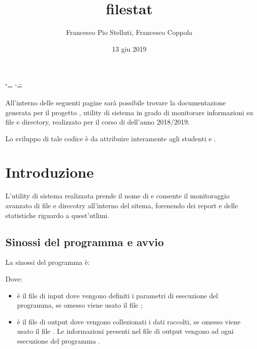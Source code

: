 \documentclass[letterpaper,10pt,italian,openany,oneside]{sphinxmanual}
\title{filestat}
\date{13 giu 2019}
\author{Francesco Pio Stelluti, Francesco Coppola}
\begin{document}
\ifdefined\shorthandoff
  \ifnum\catcode`\=\string=\active\shorthandoff{=}\fi
  \ifnum\catcode`\"=\active{}\fi
\fi

\pagestyle{empty}
\sphinxmaketitle
\pagestyle{plain}
\sphinxtableofcontents
\pagestyle{normal}
\label{\detokenize{index::doc}}


All’interno delle seguenti pagine sarà possibile trovare la documentazione
generata per il progetto , utility di sistema in grado di monitorare informazioni
su file e directory, realizzato per il corso di 
dell’anno 2018/2019.

Lo sviluppo di tale codice è da attribuire interamente agli studenti  e .


\chapter{Introduzione}
\label{\detokenize{introduzione:introduzione}}\label{\detokenize{introduzione::doc}}\begin{quote}

\end{quote}

L’utility di sistema realizzata prende il nome di  e consente il monitoraggio avanzato di
file e direcotry all’interno del sitema, forenendo dei report e delle statistiche riguardo a quest’utlimi.


\section{Sinossi del programma e avvio}
\label{\detokenize{introduzione:sinossi-del-programma-e-avvio}}
La sinossi del programma è:

\begin{sphinxVerbatim}[commandchars=\\\{\}]
 \PYG{p}{[}\PYG{p}{]} \PYG{p}{[}\PYG{p}{]} \PYG{p}{[}\PYG{p}{]}
\end{sphinxVerbatim}

Dove:
\begin{itemize}
\item {} 
 è il file di input dove vengono definiti i parametri di esecuzione del programma, se omesso viene usato il file ;

\item {} 
 è il file di output dove vengono collezionati i dati raccolti, se omesso viene usato il file . Le informazioni presenti nel file di output vengono  ad ogni esecuzione del programma .

\end{itemize}
\end{document}
